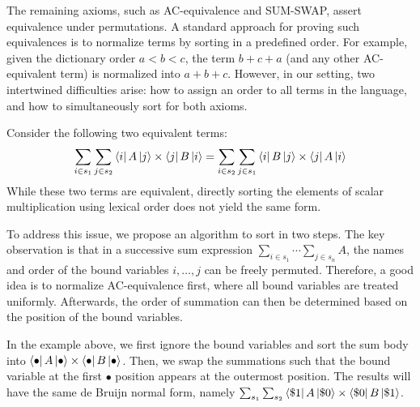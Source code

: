 The remaining axioms, such as AC-equivalence and SUM-SWAP, assert equivalence under permutations. A standard approach for proving such equivalences is to normalize terms by sorting in a predefined order. For example, given the dictionary order \( a < b < c \), the term \( b + c + a \) (and any other AC-equivalent term) is normalized into \( a + b + c \). However, in our setting, two intertwined difficulties arise: how to assign an order to all terms in the language, and how to simultaneously sort for both axioms.

Consider the following two equivalent terms:
\[
\sum_{i \in s_1} \sum_{j \in s_2} \bra{i} A \ket{j} \times \bra{j} B \ket{i}
= 
\sum_{i \in s_2} \sum_{j \in s_1} \bra{i} B \ket{j} \times \bra{j} A \ket{i}
\]
While these two terms are equivalent, directly sorting the elements of scalar multiplication using lexical order does not yield the same form.

To address this issue, we propose an algorithm to sort in two steps. The key observation is that in a successive sum expression \( \sum_{i \in s_1} \cdots \sum_{j \in s_n} A \), the names and order of the bound variables \( i, \dots, j \) can be freely permuted. Therefore, a good idea is to normalize AC-equivalence first, where all bound variables are treated uniformly. Afterwards, the order of summation can then be determined based on the position of the bound variables.


In the example above, we first ignore the bound variables and sort the sum body into \( \bra{\bullet} A \ket{\bullet} \times \bra{\bullet} B \ket{\bullet} \). Then, we swap the summations such that the bound variable at the first \( \bullet \) position appears at the outermost position. The results will have the same de Bruijn normal form, namely \( \sum_{s_1} \sum_{s_2} \bra{\$1} A \ket{\$0} \times \bra{\$0} B \ket{\$1} \).



